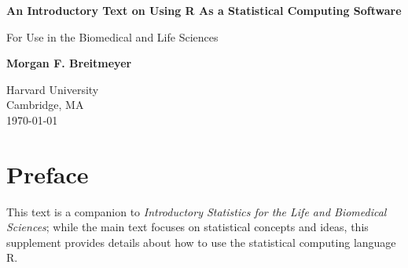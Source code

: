 \documentclass{report}\usepackage[]{graphicx}\usepackage[]{color}
\begin{document}
\minitoc

\begin{titlepage}
    \begin{center}
        \vspace*{1cm}
        
        \textbf{An Introductory Text on Using R As a Statistical Computing Software}
        
        \vspace{0.5cm}
        For Use in the Biomedical and Life Sciences 
        
        \vspace{1.5cm}
        
        \textbf{Morgan F. Breitmeyer}
        
        \vfill
        
        
        \vspace{0.8cm}
        
        
        Harvard University\\
        Cambridge, MA\\
        \today
        
    \end{center}
\end{titlepage}


\setcounter{tocdepth}{1}
\dominitoc
\tableofcontents

\newpage 
\setcounter{chapter}{-1}
\chapter{Preface}
\minitoc

This text is a companion to \textit{Introductory Statistics for the Life and Biomedical Sciences}; while the main text focuses on statistical concepts and ideas, this supplement provides details about how to use the statistical computing language \textsf{R}.
\end{document}
